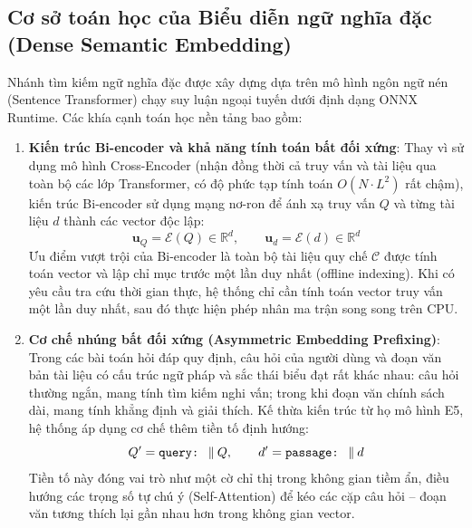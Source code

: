 \subsection{Cơ sở toán học của Biểu diễn ngữ nghĩa đặc (Dense Semantic Embedding)}

Nhánh tìm kiếm ngữ nghĩa đặc được xây dựng dựa trên mô hình ngôn ngữ nén (Sentence Transformer) chạy suy luận ngoại tuyến dưới định dạng ONNX Runtime. Các khía cạnh toán học nền tảng bao gồm:

\begin{enumerate}[nosep]
  \item \textbf{Kiến trúc Bi-encoder và khả năng tính toán bất đối xứng}:
  Thay vì sử dụng mô hình Cross-Encoder (nhận đồng thời cả truy vấn và tài liệu qua toàn bộ các lớp Transformer, có độ phức tạp tính toán $O(N \cdot L^2)$ rất chậm), kiến trúc Bi-encoder sử dụng mạng nơ-ron để ánh xạ truy vấn $Q$ và từng tài liệu $d$ thành các vector độc lập:
  \begin{equation}
    \mathbf{u}_Q = \mathcal{E}(Q) \in \mathbb{R}^d, \qquad \mathbf{u}_d = \mathcal{E}(d) \in \mathbb{R}^d
    \label{eq:bi_encoder_mapping}
  \end{equation}
  Ưu điểm vượt trội của Bi-encoder là toàn bộ tài liệu quy chế $\mathcal{C}$ được tính toán vector và lập chỉ mục trước một lần duy nhất (offline indexing). Khi có yêu cầu tra cứu thời gian thực, hệ thống chỉ cần tính toán vector truy vấn một lần duy nhất, sau đó thực hiện phép nhân ma trận song song trên CPU.

  \item \textbf{Cơ chế nhúng bất đối xứng (Asymmetric Embedding Prefixing)}:
  Trong các bài toán hỏi đáp quy định, câu hỏi của người dùng và đoạn văn bản tài liệu có cấu trúc ngữ pháp và sắc thái biểu đạt rất khác nhau: câu hỏi thường ngắn, mang tính tìm kiếm nghi vấn; trong khi đoạn văn chính sách dài, mang tính khẳng định và giải thích. Kế thừa kiến trúc từ họ mô hình E5, hệ thống áp dụng cơ chế thêm tiền tố định hướng:
  \begin{equation}
    Q' = \text{\ttfamily query:\ } \mathbin{\Vert} Q, \qquad d' = \text{\ttfamily passage:\ } \mathbin{\Vert} d
    \label{eq:asymmetric_prefix}
  \end{equation}
  Tiền tố này đóng vai trò như một cờ chỉ thị trong không gian tiềm ẩn, điều hướng các trọng số tự chú ý (Self-Attention) để kéo các cặp câu hỏi -- đoạn văn tương thích lại gần nhau hơn trong không gian vector.


\end{enumerate}
